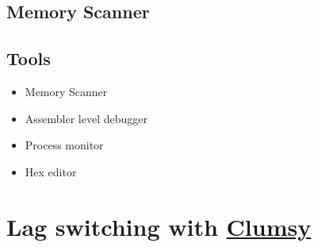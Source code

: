 \documentclass[12pt]{article}
\begin{document}
\subsection{Memory Scanner} 

\subsection{Tools}
\begin{itemize}
    \item Memory Scanner 
    \item Assembler level debugger
    \item Process monitor 
    \item Hex editor
\end{itemize}
\section{Lag switching with \href{https://jagt.github.io/clumsy/}{Clumsy}}
\end{document}
